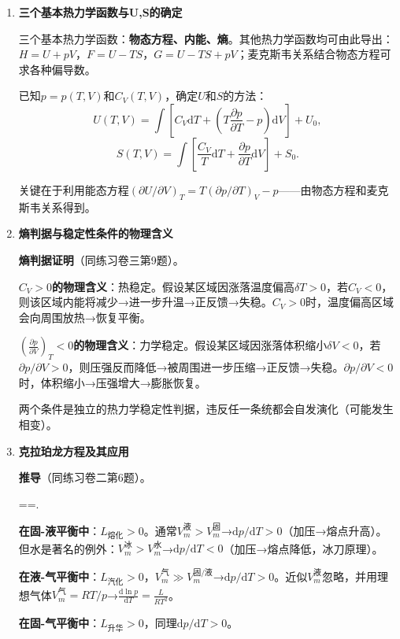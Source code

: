 \documentclass[12pt,a4paper,fontset=mac]{ctexart}
\newcommand{\dd}{\mathrm{d}}
\newcommand{\đ}{\mathrm{đ}}
\begin{document}
\begin{enumerate}

\item \textbf{三个基本热力学函数与U,S的确定}

三个基本热力学函数：\textbf{物态方程、内能、熵}。其他热力学函数均可由此导出：$H=U+pV$，$F=U-TS$，$G=U-TS+pV$；麦克斯韦关系结合物态方程可求各种偏导数。

已知$p=p(T,V)$和$C_V(T,V)$，确定$U$和$S$的方法：
\[U(T,V)=\int\left[C_V\dd T+\left(T\frac{\partial p}{\partial T}-p\right)\dd V\right]+U_0,\]
\[S(T,V)=\int\left[\frac{C_V}{T}\dd T+\frac{\partial p}{\partial T}\dd V\right]+S_0.\]

关键在于利用能态方程$(\partial U/\partial V)_T=T(\partial p/\partial T)_V-p$——由物态方程和麦克斯韦关系得到。

\item \textbf{熵判据与稳定性条件的物理含义}

\textbf{熵判据证明}（同练习卷三第9题）。

\textbf{$C_V>0$的物理含义}：热稳定。假设某区域因涨落温度偏高$\delta T>0$，若$C_V<0$，则该区域内能将减少→进一步升温→正反馈→失稳。$C_V>0$时，温度偏高区域会向周围放热→恢复平衡。

\textbf{$\left(\frac{\partial p}{\partial V}\right)_T<0$的物理含义}：力学稳定。假设某区域因涨落体积缩小$\delta V<0$，若$\partial p/\partial V>0$，则压强反而降低→被周围进一步压缩→正反馈→失稳。$\partial p/\partial V<0$时，体积缩小→压强增大→膨胀恢复。

两个条件是独立的热力学稳定性判据，违反任一条统都会自发演化（可能发生相变）。

\item \textbf{克拉珀龙方程及其应用}

\textbf{推导}（同练习卷二第6题）。

\frac{\dd p}{\dd T}==.

\textbf{在固-液平衡中}：$L_{\text{熔化}}>0$。通常$V_m^{\text{液}}>V_m^{\text{固}}$→$\dd p/\dd T>0$（加压→熔点升高）。但水是著名的例外：$V_m^{\text{冰}}>V_m^{\text{水}}$→$\dd p/\dd T<0$（加压→熔点降低，冰刀原理）。

\textbf{在液-气平衡中}：$L_{\text{汽化}}>0$，$V_m^{\text{气}}\gg V_m^{\text{固/液}}$→$\dd p/\dd T>0$。近似$V_m^{\text{液}}$忽略，并用理想气体$V_m^{\text{气}}=RT/p$→$\frac{\dd\ln p}{\dd T}=\frac{L}{RT^2}$。

\textbf{在固-气平衡中}：$L_{\text{升华}}>0$，同理$\dd p/\dd T>0$。


\end{enumerate}
\end{document}

